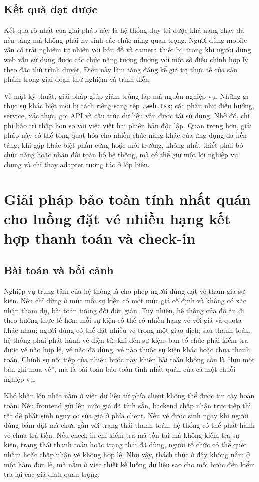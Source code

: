 \documentclass[../DoAn.tex]{subfiles}
\begin{document}
\subsection{Kết quả đạt được}
Kết quả rõ nhất của giải pháp này là hệ thống duy trì được khả năng chạy đa nền tảng mà không phải hy sinh các chức năng quan trọng. Người dùng mobile vẫn có trải nghiệm tự nhiên với bản đồ và camera thiết bị, trong khi người dùng web vẫn sử dụng được các chức năng tương đương với một số điều chỉnh hợp lý theo đặc thù trình duyệt. Điều này làm tăng đáng kể giá trị thực tế của sản phẩm trong giai đoạn thử nghiệm và trình diễn.

Về mặt kỹ thuật, giải pháp giúp giảm trùng lặp mã nguồn nghiệp vụ. Những gì thực sự khác biệt mới bị tách riêng sang tệp \texttt{.web.tsx}; các phần như điều hướng, service, xác thực, gọi \gls{API} và cấu trúc dữ liệu vẫn được tái sử dụng. Nhờ đó, chi phí bảo trì thấp hơn so với việc viết hai phiên bản độc lập. Quan trọng hơn, giải pháp này có thể tổng quát hóa cho nhiều chức năng khác của ứng dụng đa nền tảng: khi gặp khác biệt phần cứng hoặc môi trường, không nhất thiết phải bỏ chức năng hoặc nhân đôi toàn bộ hệ thống, mà có thể giữ một lõi nghiệp vụ chung và chỉ thay adapter tương tác ở lớp biên.

\section{Giải pháp bảo toàn tính nhất quán cho luồng đặt vé nhiều hạng kết hợp thanh toán và check-in}
\label{sec:solution-booking-consistency}

\subsection{Bài toán và bối cảnh}
Nghiệp vụ trung tâm của hệ thống là cho phép người dùng đặt vé tham gia sự kiện. Nếu chỉ dừng ở mức mỗi sự kiện có một mức giá cố định và không có xác nhận tham dự, bài toán tương đối đơn giản. Tuy nhiên, hệ thống của đồ án đi theo hướng thực tế hơn: mỗi sự kiện có thể có nhiều hạng vé với giá và quota khác nhau; người dùng có thể đặt nhiều vé trong một giao dịch; sau thanh toán, hệ thống phải phát hành vé điện tử; khi đến sự kiện, ban tổ chức phải kiểm tra được vé nào hợp lệ, vé nào đã dùng, vé nào thuộc sự kiện khác hoặc chưa thanh toán. Chính sự nối tiếp của nhiều bước này khiến bài toán không còn là “lưu một bản ghi mua vé”, mà là bài toán bảo toàn tính nhất quán của cả một chuỗi nghiệp vụ.

Khó khăn lớn nhất nằm ở việc dữ liệu từ phía client không thể được tin cậy hoàn toàn. Nếu frontend gửi lên mức giá đã tính sẵn, backend chấp nhận trực tiếp thì rất dễ phát sinh nguy cơ sửa giá ở phía client. Nếu vé được sinh ngay khi người dùng bấm đặt mà chưa gắn với trạng thái thanh toán, hệ thống có thể phát hành vé chưa trả tiền. Nếu check-in chỉ kiểm tra mã tồn tại mà không kiểm tra sự kiện, trạng thái thanh toán hoặc trạng thái đã dùng, người tổ chức có thể quét nhầm hoặc chấp nhận vé không hợp lệ. Như vậy, thách thức ở đây không nằm ở một hàm đơn lẻ, mà nằm ở việc thiết kế luồng dữ liệu sao cho mỗi bước đều kiểm tra lại các giả định quan trọng.
\end{document}
